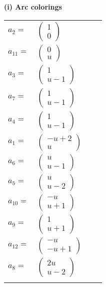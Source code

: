 \documentclass[1p]{elsarticle_modified}
\theoremstyle{definition}
\begin{document}
\flushleft \textbf{(i) Arc colorings}\\
\begin{tabular}{m{7pt} m{180pt} m{7pt} m{180pt} }
\flushright $a_{2}=$&$\begin{pmatrix}1\\0\end{pmatrix}$ \\
\flushright $a_{11}=$&$\begin{pmatrix}0\\u\end{pmatrix}$ \\
\flushright $a_{3}=$&$\begin{pmatrix}1\\u-1\end{pmatrix}$ \\
\flushright $a_{7}=$&$\begin{pmatrix}1\\u-1\end{pmatrix}$ \\
\flushright $a_{4}=$&$\begin{pmatrix}1\\u-1\end{pmatrix}$ \\
\flushright $a_{1}=$&$\begin{pmatrix}- u+2\\u\end{pmatrix}$ \\
\flushright $a_{6}=$&$\begin{pmatrix}u\\u-1\end{pmatrix}$ \\
\flushright $a_{5}=$&$\begin{pmatrix}u\\u-2\end{pmatrix}$ \\
\flushright $a_{10}=$&$\begin{pmatrix}- u\\u+1\end{pmatrix}$ \\
\flushright $a_{9}=$&$\begin{pmatrix}1\\u+1\end{pmatrix}$ \\
\flushright $a_{12}=$&$\begin{pmatrix}- u\\- u+1\end{pmatrix}$ \\
\flushright $a_{8}=$&$\begin{pmatrix}2 u\\u-2\end{pmatrix}$\\&\end{tabular}
\end{document}

